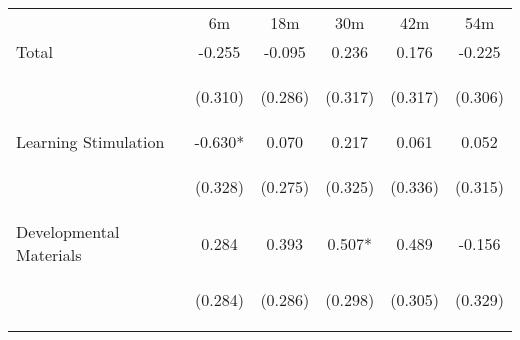 \begin{tabular}{lccccc}
\hline \noalign{\smallskip} & 6m & 18m & 30m & 42m & 54m\\
\noalign{\smallskip}\hline \noalign{\smallskip}Total & -0.255 & -0.095 & 0.236 & 0.176 & -0.225\\
 & \begin{footnotesize}(0.310)\end{footnotesize} & \begin{footnotesize}(0.286)\end{footnotesize} & \begin{footnotesize}(0.317)\end{footnotesize} & \begin{footnotesize}(0.317)\end{footnotesize} & \begin{footnotesize}(0.306)\end{footnotesize}\\
\noalign{\smallskip}Learning Stimulation & -0.630* & 0.070 & 0.217 & 0.061 & 0.052\\
 & \begin{footnotesize}(0.328)\end{footnotesize} & \begin{footnotesize}(0.275)\end{footnotesize} & \begin{footnotesize}(0.325)\end{footnotesize} & \begin{footnotesize}(0.336)\end{footnotesize} & \begin{footnotesize}(0.315)\end{footnotesize}\\
\noalign{\smallskip}Developmental Materials & 0.284 & 0.393 & 0.507* & 0.489 & -0.156\\
 & \begin{footnotesize}(0.284)\end{footnotesize} & \begin{footnotesize}(0.286)\end{footnotesize} & \begin{footnotesize}(0.298)\end{footnotesize} & \begin{footnotesize}(0.305)\end{footnotesize} & \begin{footnotesize}(0.329)\end{footnotesize}\\

\end{tabular}

